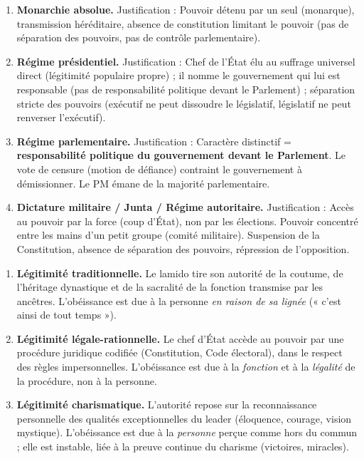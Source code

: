 \documentclass[11pt]{article}
\begin{document}
\begin{corrige}
\begin{enumerate}
\item \textbf{Monarchie absolue.} Justification : Pouvoir détenu par un seul (monarque), transmission héréditaire, absence de constitution limitant le pouvoir (pas de séparation des pouvoirs, pas de contrôle parlementaire).
\item \textbf{Régime présidentiel.} Justification : Chef de l'État élu au suffrage universel direct (légitimité populaire propre) ; il nomme le gouvernement qui lui est responsable (pas de responsabilité politique devant le Parlement) ; séparation stricte des pouvoirs (exécutif ne peut dissoudre le législatif, législatif ne peut renverser l'exécutif).
\item \textbf{Régime parlementaire.} Justification : Caractère distinctif = \textbf{responsabilité politique du gouvernement devant le Parlement}. Le vote de censure (motion de défiance) contraint le gouvernement à démissionner. Le PM émane de la majorité parlementaire.
\item \textbf{Dictature militaire / Junta / Régime autoritaire.} Justification : Accès au pouvoir par la force (coup d'État), non par les élections. Pouvoir concentré entre les mains d'un petit groupe (comité militaire). Suspension de la Constitution, absence de séparation des pouvoirs, répression de l'opposition.
\end{enumerate}
\end{corrige}

\begin{corrige}
\begin{enumerate}
\item \textbf{Légitimité traditionnelle.} Le lamido tire son autorité de la coutume, de l'héritage dynastique et de la sacralité de la fonction transmise par les ancêtres. L'obéissance est due à la personne \emph{en raison de sa lignée} (« c'est ainsi de tout temps »).
\item \textbf{Légitimité légale-rationnelle.} Le chef d'État accède au pouvoir par une procédure juridique codifiée (Constitution, Code électoral), dans le respect des règles impersonnelles. L'obéissance est due à la \emph{fonction} et à la \emph{légalité} de la procédure, non à la personne.
\item \textbf{Légitimité charismatique.} L'autorité repose sur la reconnaissance personnelle des qualités exceptionnelles du leader (éloquence, courage, vision mystique). L'obéissance est due à la \emph{personne} perçue comme hors du commun ; elle est instable, liée à la preuve continue du charisme (victoires, miracles).
\end{enumerate}
\end{corrige}
\end{document}
